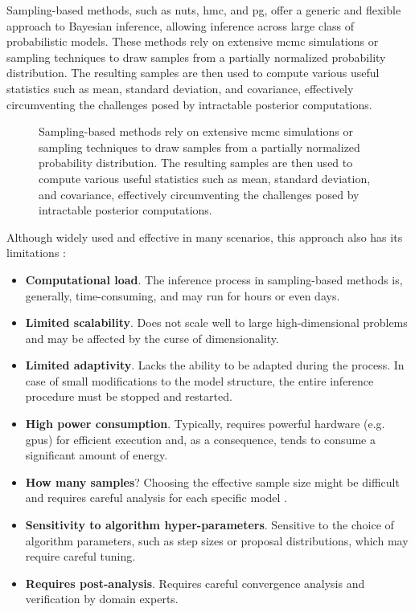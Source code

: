 Sampling-based methods, such as \ac{nuts}, \ac{hmc}, and \ac{pg}, offer a generic and flexible approach to Bayesian inference, allowing inference across large class of probabilistic models. These methods rely on extensive \ac{mcmc} simulations or sampling techniques to draw samples from a partially normalized probability distribution. 
The resulting samples are then used to compute various useful statistics such as mean, standard deviation, and covariance, effectively circumventing the challenges posed by intractable posterior computations. 
\begin{figure}
  \centering
  \resizebox{1.0\textwidth}{!}{}
  \caption{
Sampling-based methods rely on extensive \ac{mcmc} simulations or sampling techniques to draw samples from a partially normalized probability distribution. 
The resulting samples are then used to compute various useful statistics such as mean, standard deviation, and covariance, effectively circumventing the challenges posed by intractable posterior computations. 
  }
  \label{fig:intro:sampling-explained}
\end{figure}
Although widely used and effective in many scenarios, this approach also has its limitations \citep{betancourt_conceptual_2018}:
\begin{itemize}
    \item \textbf{Computational load}. The inference process in sampling-based methods is, generally, time-consuming, and may run for hours or even days.
    \item \textbf{Limited scalability}. Does not scale well to large high-dimensional problems and may be affected by the curse of dimensionality.
    \item \textbf{Limited adaptivity}. Lacks the ability to be adapted during the process. In case of small modifications to the model structure, the entire inference procedure must be stopped and restarted.
    \item \textbf{High power consumption}. Typically, requires powerful hardware (e.g. \acp{gpu}) for efficient execution \citep{henriksen_parallel_2012, terenin_gpu-accelerated_2019} and, as a consequence, tends to consume a significant amount of energy.
    \item \textbf{How many samples}? Choosing the effective sample size might be difficult and requires careful analysis for each specific model \citep{morita_determining_2008}.
    \item \textbf{Sensitivity to algorithm hyper-parameters}. Sensitive to the choice of algorithm parameters, such as step sizes or proposal distributions, which may require careful tuning.
    \item \textbf{Requires post-analysis}. Requires careful convergence analysis and verification by domain experts.
\end{itemize}

